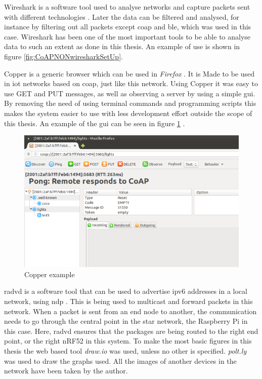 \noindent Wireshark is a software tool used to analyse networks and capture packets sent with different technologies \cite{lamping2004wireshark}. Later the data can be filtered and analysed, for instance by filtering out all packets except \gls{coap} and \gls{ble}, which was used in this case. Wireshark has been one of the most important tools to be able to analyse data to such an extent as done in this thesis. An example of use is shown in figure \ref{fig:CoAPNONwiresharkSetUp}. 

\noindent Copper  is a generic browser which can be used in \textit{Firefox} . It is Made to be used in \gls{iot} networks based on \gls{coap}, just like this network. Using Copper it was easy to use GET and PUT messages, as well as observing a server by using a simple \gls{gui}. By removing the need of using terminal commands and programming scripts this makes the system easier to use with less development effort outside the scope of this thesis. An example of the \gls{gui} can be seen in figure \ref{fig:copperExample} 
\cite{kovatsch2011demo}.

\begin{figure}[ht]
    \centering
    \includegraphics[width=1.0\textwidth]{CopperExample.png}    
    \caption{Copper example}
    \label{fig:copperExample}
\end{figure}

\noindent \gls{radvd} is a software tool that can be used to advertise \gls{ipv6} addresses in a local network, using \gls{ndp} \cite{chown2011rogue}. This is being used to multicast and forward packets in this network. When a packet is sent from an end node to another, the communication needs to go through the central point in the star network, the Raspberry Pi in this case. Here, \gls{radvd} ensures that the packages are being routed to the right end point, or the right nRF52 in this system. To make the most basic figures in this thesis the web based tool \textit{draw.io} was used, unless no other is specified. \textit{polt.ly} was used to draw the graphs used. All the images of another devices in the network have been taken by the author. 



